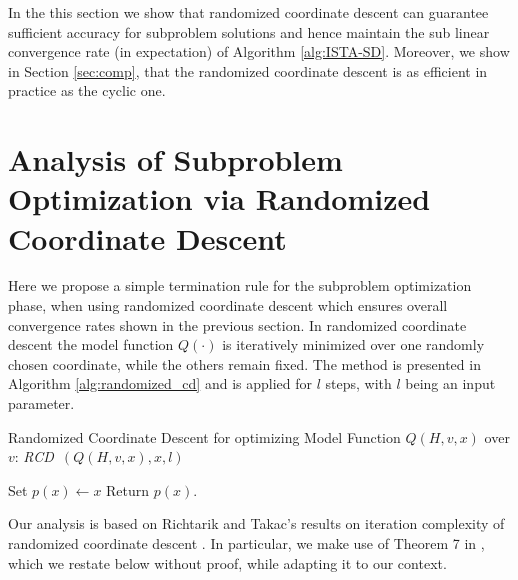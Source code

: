 \documentclass[11pt]{article}
\numberwithin{equation}{section}
\begin{document}

In the this section we show that randomized coordinate descent can guarantee sufficient accuracy for subproblem solutions and hence maintain the sub linear convergence rate (in expectation) of Algorithm \ref{alg:ISTA-SD}. Moreover, we show in Section \ref{sec:comp}, that the randomized coordinate descent is as efficient in practice as the cyclic one. 




\section{Analysis of Subproblem Optimization via Randomized Coordinate Descent} %
\label{sec:coordinate_descent_iteration_complexity}
Here we propose a simple termination rule for the subproblem optimization phase,  when using randomized coordinate descent  which ensures overall convergence rates shown in the previous section.  In randomized coordinate descent the model function $Q(\cdot)$ is iteratively minimized over one randomly chosen coordinate, while the others remain fixed. 
The method  is presented in Algorithm \ref{alg:randomized_cd} and is applied for $l$ steps, with $l$ being an input parameter. 

\begin{algorithm2e}\caption{Randomized Coordinate Descent for optimizing Model Function $Q(H, v, x)$ over $v$: {\em RCD\ }$(Q(H, v, x), x, l)$ }
    \label{alg:randomized_cd}%
Set $p(x) \gets x $\; 
Return $p(x)$.
\end{algorithm2e}








Our analysis is based on Richtarik and Takac's results on iteration complexity of randomized coordinate descent  \cite{Richtarik2012}. In particular, we make use of Theorem 7 in \cite{Richtarik2012}, which we restate below without proof, while adapting it to our context.
\end{document}
